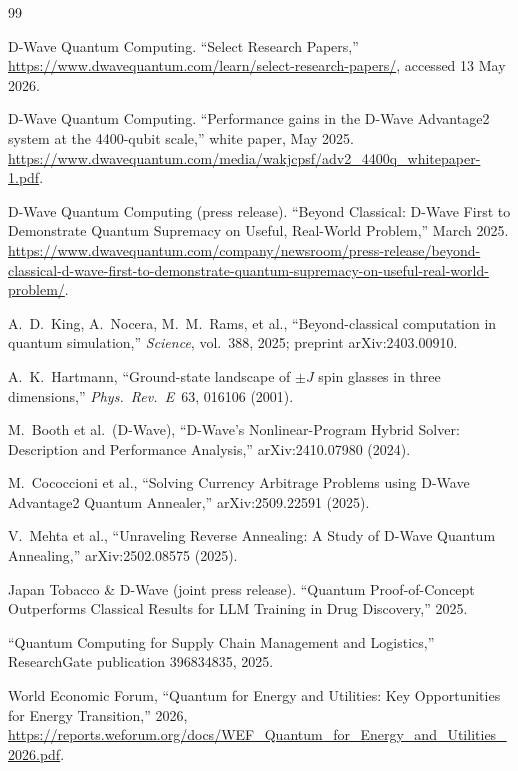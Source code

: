 \documentclass[11pt,a4paper]{article}
\begin{document}
\begin{thebibliography}{99}

D-Wave Quantum Computing.
``Select Research Papers,''
\url{https://www.dwavequantum.com/learn/select-research-papers/}, accessed 13 May 2026.

D-Wave Quantum Computing.
``Performance gains in the D-Wave Advantage2 system at the 4400-qubit scale,''
white paper, May 2025.
\url{https://www.dwavequantum.com/media/wakjcpsf/adv2_4400q_whitepaper-1.pdf}.

D-Wave Quantum Computing (press release).
``Beyond Classical: D-Wave First to Demonstrate Quantum Supremacy on Useful, Real-World Problem,''
March 2025.
\url{https://www.dwavequantum.com/company/newsroom/press-release/beyond-classical-d-wave-first-to-demonstrate-quantum-supremacy-on-useful-real-world-problem/}.

A.~D.\ King, A.\ Nocera, M.\ M.\ Rams, et al.,
``Beyond-classical computation in quantum simulation,''
\emph{Science}, vol.~388, 2025; preprint arXiv:2403.00910.

A.~K.\ Hartmann,
``Ground-state landscape of $\pm J$ spin glasses in three dimensions,''
\emph{Phys.\ Rev.\ E}~63, 016106 (2001).

M.\ Booth et al.\ (D-Wave),
``D-Wave's Nonlinear-Program Hybrid Solver: Description and Performance Analysis,''
arXiv:2410.07980 (2024).

M.\ Cococcioni et al.,
``Solving Currency Arbitrage Problems using D-Wave Advantage2 Quantum Annealer,''
arXiv:2509.22591 (2025).

V.\ Mehta et al.,
``Unraveling Reverse Annealing: A Study of D-Wave Quantum Annealing,''
arXiv:2502.08575 (2025).

Japan Tobacco \& D-Wave (joint press release).
``Quantum Proof-of-Concept Outperforms Classical Results for LLM Training in Drug Discovery,''
2025.

``Quantum Computing for Supply Chain Management and Logistics,''
ResearchGate publication 396834835, 2025.

World Economic Forum,
``Quantum for Energy and Utilities: Key Opportunities for Energy Transition,''
2026, \url{https://reports.weforum.org/docs/WEF_Quantum_for_Energy_and_Utilities_2026.pdf}.


\end{thebibliography}
\end{document}
